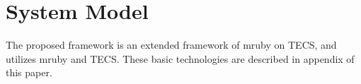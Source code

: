 \documentclass[conference]{IEEEtran/IEEEtran/IEEEtran}
\begin{document}
%
%
%
%
%
%

\section{System Model}
\label{sec:System Model}
The proposed framework is an extended framework of mruby on TECS, and utilizes mruby and TECS.
These basic technologies are described in appendix of this paper.
\end{document}
